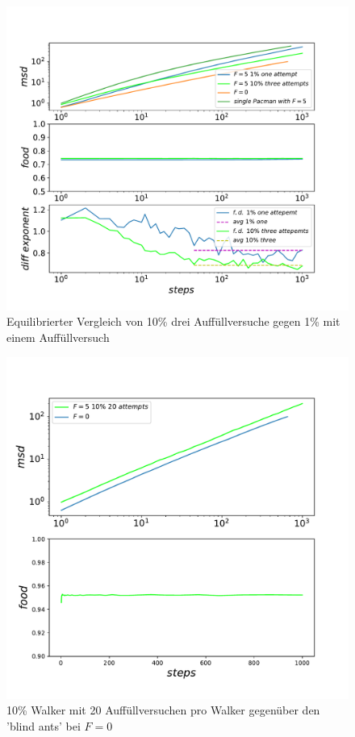 \documentclass[a4paper, 12pt]{report}
\begin{document}
\begin{figure}[H]
	\centering
	\includegraphics[scale=0.7]{10_3_vs_1_1_new.pdf}
	\caption{Equilibrierter Vergleich von 10\% drei Auffüllversuche gegen 1\% mit einem Auffüllversuch}
\end{figure}

\clearpage

\begin{figure}[H]
	\centering
	\includegraphics[scale=0.7]{fullfood.pdf}
	\caption{10\% Walker mit 20 Auffüllversuchen pro Walker gegenüber den 'blind ants' bei $F=0$}
\end{figure}
\end{document}
